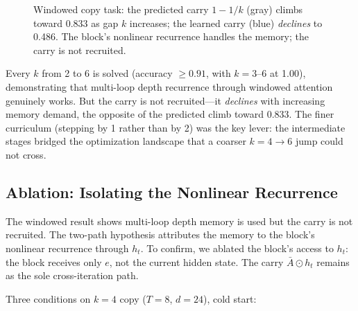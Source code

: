 \documentclass[11pt]{article}
\begin{document}
\begin{figure}[ht]
\centering
{}
\caption{Windowed copy task: the predicted carry $1 - 1/k$ (gray) climbs toward 0.833 as gap $k$ increases; the learned carry (blue) \emph{declines} to 0.486. The block's nonlinear recurrence handles the memory; the carry is not recruited.}
\label{fig:windowed-copy}
\end{figure}

Every $k$ from 2 to 6 is solved (accuracy $\geq 0.91$, with $k=3$--6 at 1.00), demonstrating that multi-loop depth recurrence through windowed attention genuinely works. But the carry is not recruited---it \emph{declines} with increasing memory demand, the opposite of the predicted climb toward 0.833. The finer curriculum (stepping by 1 rather than by 2) was the key lever: the intermediate stages bridged the optimization landscape that a coarser $k=4 \to 6$ jump could not cross.

\subsection{Ablation: Isolating the Nonlinear Recurrence}
\label{subsec:ablation}

The windowed result shows multi-loop depth memory is used but the carry is not recruited. The two-path hypothesis attributes the memory to the block's nonlinear recurrence through $h_t$. To confirm, we ablated the block's access to $h_t$: the block receives only $e$, not the current hidden state. The carry $\bar{A} \odot h_t$ remains as the sole cross-iteration path.

Three conditions on $k=4$ copy ($T=8$, $d=24$), cold start:
\end{document}
